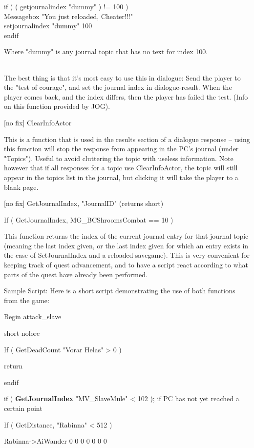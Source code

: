 \documentclass[
]{article}
\begin{document}
if ( ( getjournalindex "dummy" ) != 100 )\\
Messagebox "You just reloaded, Cheater!!!"\\
setjournalindex "dummy" 100\\
endif

Where "dummy" is any journal topic that has no text for index 100.\\
\strut \\
The best thing is that it's most easy to use this in dialogue: Send the
player to the "test of courage", and set the journal index in
dialogue-result. When the player comes back, and the index differs, then
the player has failed the test. (Info on this function provided by JOG).

{[}no fix{]} ClearInfoActor

This is a function that is used in the results section of a dialogue
response -- using this function will stop the response from appearing in
the PC's journal (under "Topics"). Useful to avoid cluttering the topic
with useless information. Note however that if all responses for a topic
use ClearInfoActor, the topic will still appear in the topics list in
the journal, but clicking it will take the player to a blank page.

{[}no fix{]} GetJournalIndex, "JournalID" (returns short)

If ( GetJournalIndex, MG\_BCShroomsCombat == 10 )

This function returns the index of the current journal entry for that
journal topic (meaning the last index given, or the last index given for
which an entry exists in the case of SetJournalIndex and a reloaded
savegame). This is very convenient for keeping track of quest
advancement, and to have a script react according to what parts of the
quest have already been performed.

Sample Script: Here is a short script demonstrating the use of both
functions from the game:

Begin attack\_slave

short nolore

If ( GetDeadCount "Vorar Helas" \textgreater{} 0 )

return

endif

if ( \textbf{GetJournalIndex} "MV\_SlaveMule" \textless{} 102 ); if PC
has not yet reached a certain point

If ( GetDistance, "Rabinna" \textless{} 512 )

Rabinna-\textgreater AiWander 0 0 0 0 0 0 0
\end{document}
